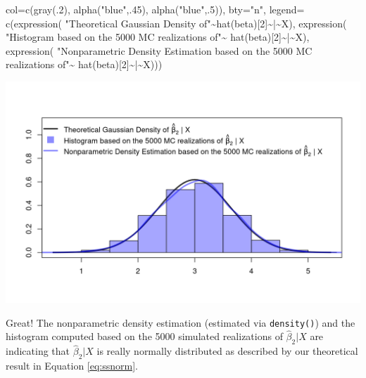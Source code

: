\documentclass[
  14pt,
]{memoir}
\newenvironment{Shaded}{\begin{snugshade}}{\end{snugshade}}
\newcommand{\AttributeTok}[1]{\textcolor[rgb]{0.77,0.63,0.00}{#1}}
\newcommand{\DecValTok}[1]{\textcolor[rgb]{0.00,0.00,0.81}{#1}}
\newcommand{\FunctionTok}[1]{\textcolor[rgb]{0.00,0.00,0.00}{#1}}
\newcommand{\NormalTok}[1]{#1}
\newcommand{\SpecialCharTok}[1]{\textcolor[rgb]{0.00,0.00,0.00}{#1}}
\newcommand{\StringTok}[1]{\textcolor[rgb]{0.31,0.60,0.02}{#1}}
\begin{document}
\begin{Shaded}
\begin{Highlighting}[]
     \AttributeTok{col=}\FunctionTok{c}\NormalTok{(}\FunctionTok{gray}\NormalTok{(.}\DecValTok{2}\NormalTok{), }\FunctionTok{alpha}\NormalTok{(}\StringTok{"blue"}\NormalTok{,.}\DecValTok{45}\NormalTok{), }\FunctionTok{alpha}\NormalTok{(}\StringTok{"blue"}\NormalTok{,.}\DecValTok{5}\NormalTok{)), }\AttributeTok{bty=}\StringTok{"n"}\NormalTok{, }\AttributeTok{legend=} 
\FunctionTok{c}\NormalTok{(}\FunctionTok{expression}\NormalTok{(}
  \StringTok{"Theoretical Gaussian Density of"}\SpecialCharTok{\textasciitilde{}}\FunctionTok{hat}\NormalTok{(beta)[}\DecValTok{2}\NormalTok{]}\SpecialCharTok{\textasciitilde{}}\StringTok{\textquotesingle{}|\textquotesingle{}}\SpecialCharTok{\textasciitilde{}}\NormalTok{X), }
  \FunctionTok{expression}\NormalTok{(}
  \StringTok{"Histogram based on the 5000 MC realizations of"}\SpecialCharTok{\textasciitilde{}}
  \FunctionTok{hat}\NormalTok{(beta)[}\DecValTok{2}\NormalTok{]}\SpecialCharTok{\textasciitilde{}}\StringTok{\textquotesingle{}|\textquotesingle{}}\SpecialCharTok{\textasciitilde{}}\NormalTok{X), }
  \FunctionTok{expression}\NormalTok{(}
  \StringTok{"Nonparametric Density Estimation based on the 5000 MC realizations of"}\SpecialCharTok{\textasciitilde{}}
  \FunctionTok{hat}\NormalTok{(beta)[}\DecValTok{2}\NormalTok{]}\SpecialCharTok{\textasciitilde{}}\StringTok{\textquotesingle{}|\textquotesingle{}}\SpecialCharTok{\textasciitilde{}}\NormalTok{X)))}
\end{Highlighting}
\end{Shaded}

\begin{center}\includegraphics[width=1\textwidth]{figure/minimal-unnamed-chunk-72-1} \end{center}

Great! The nonparametric density estimation (estimated via \texttt{density()}) and the histogram computed based on the 5000 simulated realizations of \(\hat\beta_2|X\) are indicating that \(\hat\beta_2|X\) is really normally distributed as described by our theoretical result in Equation \eqref{eq:ssnorm}.
\end{document}

